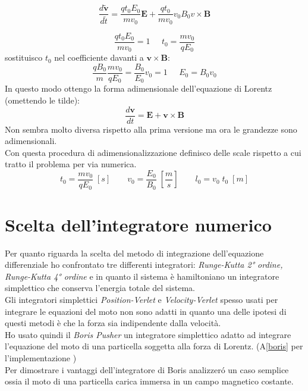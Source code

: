 \documentclass[11pt]{article}
\begin{document}
\begin{equation}\frac{d\mathbf{\tilde{v}}}{d\tilde{t}}=\frac{qt_0 E_0}{mv_0}\mathbf{E}+\frac{qt_0}{mv_0}v_0 B_0  v \times \mathbf{B} \end{equation}


\begin{equation}\frac{qt_0 E_0}{mv_0}=1 \;\;\;\;\; t_0=\frac{mv_0}{q E_0}\end{equation}
sostituisco $t_0$ nel coefficiente davanti a $\mathbf{v} \times \mathbf{B}:$
\begin{equation}\frac{qB_0}{m } \frac{m v_0}{q E_0}=\frac{B_0}{E_0}{v_0}=1 \;\;\;\;\; E_0=B_0v_0\end{equation}
In questo modo ottengo la forma adimensionale dell'equazione di Lorentz (omettendo le tilde):
\begin{equation}\frac{d\mathbf{v}}{dt}=\mathbf{E}+\mathbf{v} \times \mathbf{B} \end{equation}
Non sembra molto diversa rispetto alla prima versione ma ora le grandezze sono adimensionali. \\
Con questa procedura di adimensionalizzazione definisco delle scale rispetto a cui tratto il problema per via numerica.
\begin{equation}t_0 = \frac{m  v_0}  {q  E_0}\; [s] \qquad v_0 = \frac{E_0}{B_0} \; \left[\frac{m}{s}\right] \qquad l_0 = v_0\;t_0 \; [m]\end{equation}



\section{Scelta dell'integratore numerico}
Per quanto riguarda la scelta del metodo di integrazione dell'equazione differenziale ho confrontato tre differenti integratori: \emph{Runge-Kutta 2° ordine, Runge-Kutta 4° ordine} e in quanto il sistema è hamiltoniano un integratore simplettico che conserva l'energia totale del sistema. \\
Gli integratori simplettici \emph{Position-Verlet} e \emph{Velocity-Verlet} spesso usati per integrare le equazioni del moto non sono adatti in quanto una delle ipotesi di questi metodi è che la forza sia indipendente dalla velocit\`a.\\
Ho usato quindi il \emph{Boris Pusher} un integratore simplettico adatto ad integrare l'equazione del moto di una particella soggetta alla forza di Lorentz. (A\ref{boris} per l'implementazione )\\
Per dimostrare i vantaggi dell'integratore di Boris analizzeró un caso semplice ossia il moto di una particella carica immersa in un campo magnetico costante.
\end{document}
